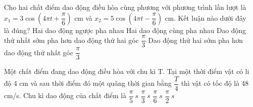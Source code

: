 \begin{ex}%
Cho hai chất điểm dao động điều hòa cùng phương với phương trình lần lượt là $x_1 = 3\cos\left(4\pi t + \dfrac{\pi}{6}\right)$ cm và $x_2 = 5\cos\left(4\pi t - \dfrac{\pi}{6}\right)$ cm. Kết luận nào dưới đây là đúng?
\choice
{Hai dao động ngược pha nhau}
{Hai dao động cùng pha nhau}
{\True Dao động thứ nhất sớm pha hơn dao động thứ hai góc $\dfrac{\pi}{3}$}
{Dao động thứ hai sớm pha hơn dao động thứ nhất góc $\dfrac{\pi}{3}$}
\end{ex} 



\begin{ex}%
Một chất điểm đang dao động điều hòa với chu kì T. Tại một thời điểm vật có li độ 4 cm và sau thời điểm đó một quãng thời gian bằng $\dfrac{T}{4}$ thì vật có tốc độ là 48 cm/s. Chu kì dao động của chất điểm là
\choice
{$\dfrac{\pi}{5}\ s$}
{$\dfrac{\pi}{3}\ s$}
{\True $\dfrac{\pi}{6}\ s$}
{$\dfrac{\pi}{2}\ s$}
\end{ex} 




